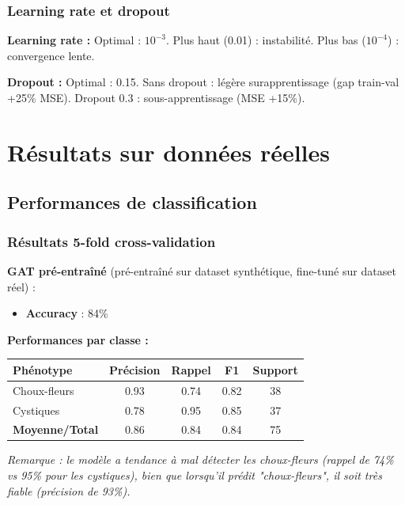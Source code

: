 \subsubsection{Learning rate et dropout}

\textbf{Learning rate :}
Optimal : $10^{-3}$. Plus haut (0.01) : instabilité. Plus bas ($10^{-4}$) : convergence lente.

\textbf{Dropout :}
Optimal : 0.15. Sans dropout : légère surapprentissage (gap train-val +25\% MSE). Dropout 0.3 : sous-apprentissage (MSE +15\%).

\section{Résultats sur données réelles}

\subsection{Performances de classification}

\subsubsection{Résultats 5-fold cross-validation}

\textbf{GAT pré-entraîné} (pré-entraîné sur dataset synthétique, fine-tuné sur dataset réel) :
\begin{itemize}
    \item \textbf{Accuracy} : 84\%
\end{itemize}

\textbf{Performances par classe :}
\begin{center}
\begin{tabular}{|l|c|c|c|c|}
\hline
\textbf{Phénotype} & \textbf{Précision} & \textbf{Rappel} & \textbf{F1} & \textbf{Support} \\
\hline
Choux-fleurs & 0.93 & 0.74 & 0.82 & 38 \\
Cystiques & 0.78 & 0.95 & 0.85 & 37 \\
\hline
\textbf{Moyenne/Total} & 0.86 & 0.84 & 0.84 & 75 \\
\hline
\end{tabular}
\end{center}

\textit{Remarque : le modèle a tendance à mal détecter les choux-fleurs (rappel de 74\% vs 95\% pour les cystiques), bien que lorsqu'il prédit "choux-fleurs", il soit très fiable (précision de 93\%).}

